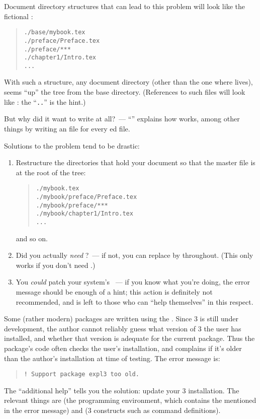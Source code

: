 {Document directory structures that can lead to this problem will look
like the fictional :
\begin{quote}
\begin{verbatim}
./base/mybook.tex
./preface/Preface.tex
./preface/***
./chapter1/Intro.tex
...
\end{verbatim}
\end{quote}
With such a structure, any document directory (other than the one
where  lives), seems ``up'' the tree from the
base directory.  (References to such files will look like
: the ``\texttt{..}'' is the
hint.)

But why did it want to write at all?~--- %
``'' explains
how  works, among other things by writing an
 file for every ed file.

Solutions to the problem tend to be drastic:
\begin{enumerate}
\item Restructure the directories that hold your document so that the
  master file is at the root of the tree:
  \begin{quote}
\begin{verbatim}
./mybook.tex
./mybook/preface/Preface.tex
./mybook/preface/***
./mybook/chapter1/Intro.tex
...
\end{verbatim}
  \end{quote}
  and so on.
\item Did you actually \emph{need} ?~--- if not, you can
  replace  by  throughout.  (This only works
  if you don't need .)
\item You \emph{could} patch your system's ~--- if you
  know what you're doing, the error message should be enough of a
  hint; this action is definitely not recommended, and is left to
  those who can ``help themselves'' in this respect.
\end{enumerate}


Some (rather modern) packages are written using the %
.  Since \latex{}3
is still under development, the author cannot reliably guess what
version of \latex{}3 the user has installed, and whether that version
is adequate for the current package.  Thus the package's code often
checks the user's installation, and complains if it's older than the
author's installation at time of testing.  The error message is:
\begin{quote}
\begin{verbatim}
! Support package expl3 too old.
\end{verbatim}
\end{quote}
The ``additional help'' tells you the solution: update your \latex{}3
installation.  The relevant things are  (the
programming environment, which contains the  mentioned
in the error message) and  (\latex{}3 constructs
such as command definitions).

}
